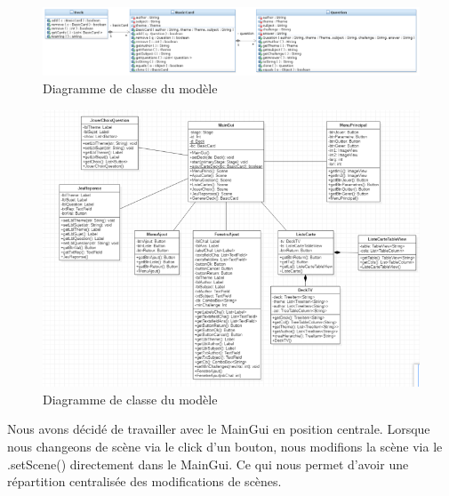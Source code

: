 \begin{figure}[h]
	\centering
	\includegraphics[width=\textwidth]{TTMC_Model_Diagram.png}
	\caption{Diagramme de classe du modèle}
	\label{fig:diag_modele}
\end{figure}

\begin{figure}[h]
	\centering
	\includegraphics[width=\textwidth]{DiagrammeClasseVue.png}
	\caption{Diagramme de classe du modèle}
	\label{fig:diag_modele}
\end{figure}

Nous avons décidé de travailler avec le MainGui en position centrale. Lorsque nous changeons de scène via le click d’un bouton, nous modifions la scène via le .setScene() directement dans le MainGui. Ce qui nous permet d’avoir une répartition centralisée des modifications de scènes.
